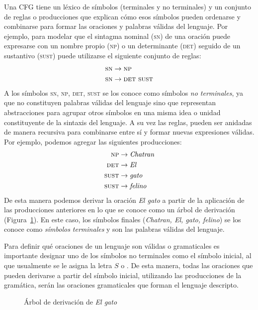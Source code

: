Una CFG tiene un léxico de símbolos (terminales y no terminales) y un conjunto de reglas o producciones que explican cómo esos símbolos pueden ordenarse y combinarse para formar las oraciones y palabras válidas del lenguaje. Por ejemplo, para modelar que el sintagma nominal (\textsc{sn}) de una oración puede expresarse con un nombre propio (\textsc{np}) o un determinante (\textsc{det}) seguido de un sustantivo (\textsc{sust}) puede utilizarse el siguiente conjunto de reglas:
%
\begin{align*}
    \textsc{sn} &\to \textsc{np}\\
    \textsc{sn} &\to \textsc{det}\ \textsc{sust}
\end{align*}
%
A los símbolos \textsc{sn}, \textsc{np}, \textsc{det}, \textsc{sust} se los conoce como símbolos {\em no terminales}, ya que no constituyen palabras válidas del lenguaje sino que representan abstracciones para agrupar otros símbolos en una misma idea o unidad constituyente de la sintaxis del lenguaje. A su vez las reglas, pueden ser anidadas de manera recursiva para combinarse entre sí y formar nuevas expresiones válidas. Por ejemplo, podemos agregar las siguientes producciones:
%
\begin{align*}
    \textsc{np}   &\to \textit{Chatran}\\
    \textsc{det}  &\to \textit{El}\\
    \textsc{sust} &\to \textit{gato}\\
    \textsc{sust} &\to \textit{felino}
\end{align*}
%
De esta manera podemos derivar la oración \textit{El gato} a partir de la aplicación de las producciones anteriores en lo que se conoce como un árbol de derivación (Figura~\ref{intro:arbol}). En este caso, los símbolos finales (\textit{Chatran, El, gato, felino}) se los conoce como {\em símbolos terminales} y son las palabras válidas del lenguaje. 

Para definir qué oraciones de un lenguaje son válidas o gramaticales  es importante designar uno de los símbolos no terminales como el símbolo inicial, al que usualmente se le asigna la letra $S$ o \start. De esta manera, todas las oraciones que pueden derivarse a partir del símbolo inicial, utilizando las producciones de la gramática, serán las oraciones gramaticales que forman el lenguaje descripto. 

\begin{figure}[h!]
    \centering
    \caption{Árbol de derivación de \textit{El gato}}
    \label{intro:arbol}
\end{figure}

